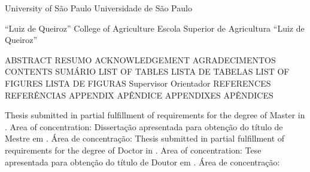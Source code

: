   {University of São Paulo} 
               {Universidade de São Paulo} {} 

    {``Luiz de Queiroz'' College of Agriculture}
                  {Escola Superior de Agricultura ``Luiz de Queiroz''} {}

     {ABSTRACT}          {RESUMO}           {}
       {ACKNOWLEDGEMENT}   {AGRADECIMENTOS}   {} 
     {CONTENTS}          {SUMÁRIO}          {}
       {LIST OF TABLES}    {LISTA DE TABELAS} {}
      {LIST OF FIGURES}   {LISTA DE FIGURAS} {}
   {Supervisor}        {Orientador}       {}
 {REFERENCES}        {REFERÊNCIAS}      {}
     {APPENDIX}          {APÊNDICE}         {}  
   {APPENDIXES}        {APÊNDICES}        {}

 {Thesis submitted in partial fulfillment of requirements for the degree of Master in \the\titarea. Area of concentration: \the\concarea}   
           {Dissertação apresentada para obtenção do título de Mestre em \the\titarea. Área de concentração: \the\concarea}   {}
 {Thesis submitted in partial fulfillment of requirements for the degree of Doctor in \the\titarea. Area of concentration: \the\concarea}     
           {Tese apresentada para obtenção do título de Doutor em \the\titarea. Área de concentração: \the\concarea}   {}




\def\worktype[#1/#2]{%
   \isdefined{wt:#1}\iftrue \csname wt:#1\endcsname \relax
      \else \esalqstyleERR {Unknown \noexpand\worktype parameter}\fi
   \isdefined{wl:#2}\iftrue \csname wl:#2\endcsname \relax
      \else \esalqstyleERR {Unknown \noexpand\worktype parameter}\fi
}



\let\LMTone\relax %


